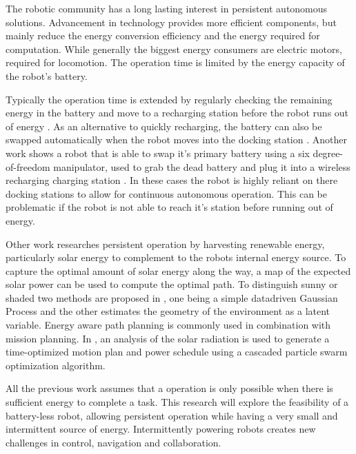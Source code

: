 \documentclass[../MainPaper.tex]{subfiles}
\begin{document}


The robotic community has a long lasting interest in persistent autonomous solutions.
Advancement in technology provides more efficient components, but mainly reduce the energy conversion efficiency and the energy required for computation.
While generally the biggest energy consumers are electric motors, required for locomotion.
The operation time is limited by the energy capacity of the robot's battery.

Typically the operation time is extended by regularly checking the remaining energy in the battery and move to a recharging station before the robot runs out of energy \cite{RN2, RN3}.
As an alternative to quickly recharging, the battery can also be swapped automatically when the robot moves into the docking station \cite{RN33}.
Another work shows a robot that is able to swap it's primary battery using a six degree-of-freedom manipulator, used to grab the dead battery and plug it into a wireless recharging charging station \cite{RN32}.
In these cases the robot is highly reliant on there docking stations to allow for continuous autonomous operation.
This can be problematic if the robot is not able to reach it's station before running out of energy.

Other work researches persistent operation by harvesting renewable energy, particularly solar energy to complement to the robots internal energy source.
To capture the optimal amount of solar energy along the way, a map of the expected solar power can be used to compute the optimal path. To distinguish sunny or shaded two methods are proposed in \cite{RN42}, one being a simple datadriven Gaussian Process and the other estimates the geometry of the environment as a latent variable.
Energy aware path planning is commonly used in combination with mission planning.
In \cite{RN30}, an analysis of the solar radiation is used to generate a time-optimized motion plan and power schedule using a cascaded particle swarm optimization algorithm.

All the previous work assumes that a operation is only possible when there is sufficient energy to complete a task. 
This research will explore the feasibility of a battery-less robot, allowing persistent operation while having a very small and intermittent source of energy.
Intermittently powering robots creates new challenges in control, navigation and collaboration.
\end{document}
